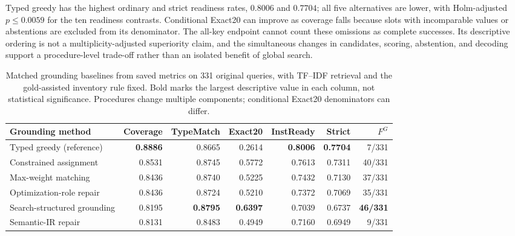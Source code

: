 \documentclass[pdflatex,iicol,sn-basic,Numbered]{sn-jnl}
\begin{document}
Typed greedy has the highest ordinary and strict readiness rates, $0.8006$ and $0.7704$; all five alternatives are lower, with Holm-adjusted $p\leq0.0059$ for the ten readiness contrasts. Conditional Exact20 can improve as coverage falls because slots with incomparable values or abstentions are excluded from its denominator. The all-key endpoint cannot count these omissions as complete successes. Its descriptive ordering is not a multiplicity-adjusted superiority claim, and the simultaneous changes in candidates, scoring, abstention, and decoding support a procedure-level trade-off rather than an isolated benefit of global search.

\begin{table}[t]
  \centering
  \caption{Matched grounding baselines from saved metrics on 331 original queries, with TF--IDF retrieval and the gold-assisted inventory rule fixed. Bold marks the largest descriptive value in each column, not statistical significance. Procedures change multiple components; conditional Exact20 denominators can differ.}
  \label{tab:nlp4lp-grounding-baselines}
  \small
  \setlength{\tabcolsep}{2.2pt}
  \renewcommand{\arraystretch}{1.12}
  \begin{tabular}{@{}lrrrrrr@{}}
    \toprule
    Grounding method & Coverage & TypeMatch & Exact20 & InstReady & Strict & $F^G$ \\
    \midrule
    Typed greedy (reference) & \textbf{0.8886} & 0.8665 & 0.2614 & \textbf{0.8006} & \textbf{0.7704} & 7/331 \\
    Constrained assignment & 0.8531 & 0.8745 & 0.5772 & 0.7613 & 0.7311 & 40/331 \\
    Max-weight matching & 0.8436 & 0.8740 & 0.5225 & 0.7432 & 0.7130 & 37/331 \\
    Optimization-role repair & 0.8436 & 0.8724 & 0.5210 & 0.7372 & 0.7069 & 35/331 \\
    Search-structured grounding & 0.8195 & \textbf{0.8795} & \textbf{0.6397} & 0.7039 & 0.6737 & \textbf{46/331} \\
    Semantic-IR repair & 0.8131 & 0.8483 & 0.4949 & 0.7160 & 0.6949 & 9/331 \\
    \bottomrule
  \end{tabular}


\end{table}
\end{document}
